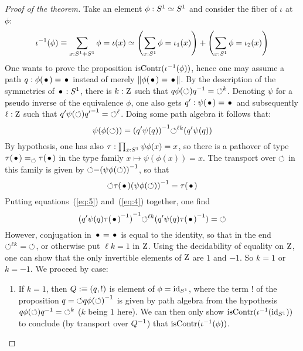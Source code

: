 \documentclass[english,a4]{article}
\begin{document}
\begin{proof}[Proof of the theorem]
  Take an element $\phi : {S^1} \simeq {S^1}$ and consider the fiber of
  $\iota$ at $\phi$:
  \begin{equation}
    \label{eq:fiber-iota-two-components}%
    \inv\iota(\phi) \jdeq \sum_{x:\Sc+\Sc} \phi = \iota(x)
    \weq \left(\sum_{x:\Sc}\phi = \iota_1(x)\right) +
    \left(\sum_{x:\Sc}\phi = \iota_2(x)\right)
  \end{equation}
  One wants to prove the proposition $\mathrm{isContr}({\iota}^{-1}(\phi))$,
  hence one may assume a path $q:\phi(\base) = \base$ instead of
  merely $\Trunc{\phi(\base) = \base}$. By the description of the
  symmetries of $\base:\Sc$, there is $k:\mathrm{Z}$ such that
  $q\phi(\mathord{\circlearrowleft}){q}^{-1} = \mathord{\circlearrowleft}^k$. Denoting $\psi$ for a pseudo
  inverse of the equivalence $\phi$, one also gets
  $q':\psi(\base) = \base$ and subsequently $\ell:\mathrm{Z}$ such that
  $q'\psi(\mathord{\circlearrowleft}){q'}^{-1} = \mathord{\circlearrowleft}^\ell$. Doing some path algebra it
  follows that:
  \begin{equation}
    \label{eq:4}
    \psi(\phi(\mathord{\circlearrowleft})) = {(q' \psi(q))}^{-1}\mathord{\circlearrowleft}^{\ell k} (q' \psi(q))
  \end{equation}
  By hypothesis, one has also $\tau : \prod_{x:{S^1}}\psi\phi(x) = x$,
  so there is a pathover of type
  $\pathover {\tau(\base)} {} \Sloop {\tau(\base)}$ in the type family
  $x \mapsto \psi(\phi(x)) = x$. The transport over $\mathord{\circlearrowleft}$ in this
  family is given by $\mathord{\circlearrowleft} \mathord{-} {(\psi\phi(\mathord{\circlearrowleft}))}^{-1}$, so that
  \begin{equation}
    \label{eq:5}
    \Sloop \tau(\base) \inv{(\psi\phi(\Sloop))} = \tau(\base)
  \end{equation}
  Putting equations~(\ref{eq:5}) and~(\ref{eq:4}) together, one find
  \begin{equation}
    \label{eq:6}
    \inv{(q' \psi(q) \inv{\tau(\base)})} \Sloop^{\ell k} (q' \psi(q) \inv{\tau(\base)}) = \Sloop
  \end{equation}
  However, conjugation in $\base = \base$ is equal to the identity, so
  that in the end $\mathord{\circlearrowleft}^{\ell k} = \mathord{\circlearrowleft}$, or otherwise put
  $\ell k = 1$ in $\mathrm{Z}$. Using the decidability of equality on
  $\mathrm{Z}$, one can show that the only invertible elements of $\mathrm{Z}$ are
  $1$ and $-1$. So $k = 1$ or $k = -1$. We proceed by case:
  \begin{enumerate}
  \item If $k=1$, then $Q \mathrel{\hbox{:}\mkern-5mu\equiv} (q, !)$ is element of
    $\phi = \mathord{\mathrm{id}}_{S^1}$, where the term $!$ of the proposition
    $q=\mathord{\circlearrowleft} q {\phi(\mathord{\circlearrowleft})}^{-1}$ is given by path algebra from the
    hypothesis $q\phi(\mathord{\circlearrowleft}){q}^{-1}=\mathord{\circlearrowleft}^k$ ($k$ being $1$ here). We
    can then only show $\mathrm{isContr}({\iota}^{-1}(\mathord{\mathrm{id}}_{S^1}))$ to conclude (by
    transport over ${Q}^{-1}$) that $\mathrm{isContr}({\iota}^{-1}(\phi))$. 


\end{enumerate}
\end{proof}
\end{document}
